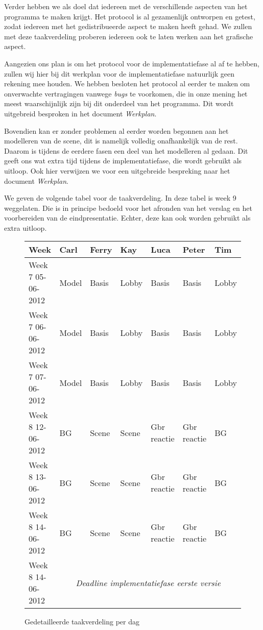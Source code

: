 \documentclass[a4paper,11pt]{article}
\begin{document}
    Verder hebben we als doel dat iedereen met de verschillende aspecten van het programma te maken krijgt. Het protocol is al gezamenlijk ontworpen en getest, zodat iedereen met het gedistribueerde aspect te maken heeft gehad. We zullen met deze taakverdeling proberen iedereen ook te laten werken aan het grafische aspect.
    
    Aangezien ons plan is om het protocol voor de implementatiefase al af te hebben, zullen wij hier bij dit werkplan voor de implementatiefase natuurlijk geen rekening mee houden. We hebben besloten het protocol al eerder te maken om onverwachte vertragingen vanwege \emph{bugs} te voorkomen, die in onze mening het meest waarschijnlijk zijn bij dit onderdeel van het programma. Dit wordt uitgebreid besproken in het document \emph{Werkplan}.
    
    Bovendien kan er zonder problemen al eerder worden begonnen aan het modelleren van de scene, dit is namelijk volledig onafhankelijk van de rest. Daarom is tijdens de eerdere fasen een deel van het modelleren al gedaan. Dit geeft ons wat extra tijd tijdens de implementatiefase, die wordt gebruikt als uitloop. Ook hier verwijzen we voor een uitgebreide bespreking naar het document \emph{Werkplan}.
    
    We geven de volgende tabel voor de taakverdeling. In deze tabel is week 9 weggelaten. Die is in principe bedoeld voor het afronden van het verslag en het voorbereiden van de eindpresentatie. Echter, deze kan ook worden gebruikt als extra uitloop.
   \begin{figure}[H]
        \small
        \centering
        \begin{tabular}{| l | l | l | l | l | l | l |}
        \hline
        Week & Carl & Ferry & Kay & Luca & Peter & Tim \\ \hline
        Week 7 05-06-2012 & Model & Basis & Lobby & Basis & Basis & Lobby \\ \hline
        Week 7 06-06-2012 & Model & Basis & Lobby & Basis & Basis & Lobby \\ \hline
        Week 7 07-06-2012 & Model & Basis & Lobby & Basis & Basis & Lobby \\ \hline
        Week 8 12-06-2012 & BG & Scene & Scene & Gbr reactie & Gbr reactie & BG \\ \hline
        Week 8 13-06-2012 & BG & Scene & Scene & Gbr reactie & Gbr reactie & BG \\ \hline
        Week 8 14-06-2012 & BG & Scene & Scene & Gbr reactie & Gbr reactie & BG \\ \hline
        Week 8 14-06-2012 & \multicolumn{6}{|c|}{\emph{Deadline implementatiefase eerste versie}} \\ \hline
        \end{tabular}
        \caption{Gedetailleerde taakverdeling per dag}
        \label{tab:planning}
    \end{figure}
\end{document}

